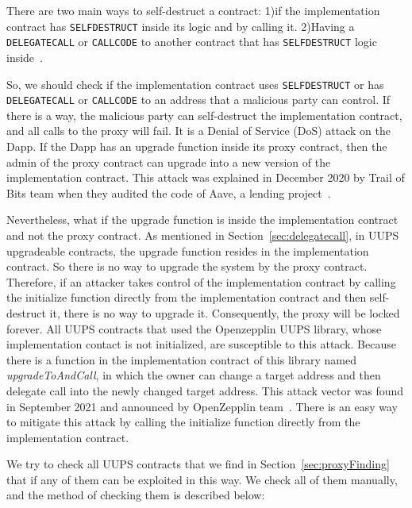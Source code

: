 There are two main ways to self-destruct a contract: 1)if the implementation contract has \texttt{SELFDESTRUCT} inside its logic and by calling it. 2)Having a \texttt{DELEGATECALL} or \texttt{CALLCODE} to another contract that has \texttt{SELFDESTRUCT} logic inside~\cite{frowisnot}.

So, we should check if the implementation contract uses \texttt{SELFDESTRUCT} or has \texttt{DELEGATECALL} or \texttt{CALLCODE} to an address that a malicious party can control. If there is a way, the malicious party can self-destruct the implementation contract, and all calls to the proxy will fail. It is a Denial of Service (DoS) attack on the Dapp.
If the Dapp has an upgrade function inside its proxy contract, then the admin of the proxy contract can upgrade into a new version of the implementation contract. This attack was explained in December 2020 by  Trail of Bits team when they audited the code of Aave, a lending project~\cite{aaveBreak}.

Nevertheless, what if the upgrade function is inside the implementation contract and not the proxy contract. As mentioned in Section~\ref{sec:delegatecall}, in UUPS upgradeable contracts, the upgrade function resides in the implementation contract. So there is no way to upgrade the system by the proxy contract. Therefore, if an attacker takes control of the implementation contract by calling the initialize function directly from the implementation contract and then self-destruct it, there is no way to upgrade it. Consequently, the proxy will be locked forever. 
All UUPS contracts that used the Openzepplin UUPS library, whose implementation contact is not initialized, are susceptible to this attack. Because there is a function in the implementation contract of this library named \textit{upgradeToAndCall}, in which the owner can change a target address and then delegate call into the newly changed target address. This attack vector was found in September 2021 and announced by OpenZepplin team~\cite{securityAdvise,uupsAttacks}. There is an easy way to mitigate this attack by calling the initialize function directly from the implementation contract. 

We try to check all UUPS contracts that we find in Section~\ref{sec:proxyFinding} that if any of them can be exploited in this way. We check all of them manually, and the method of checking them is described below:


